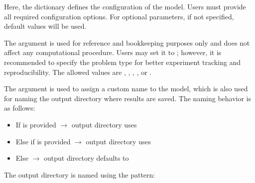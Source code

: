 \documentclass[letterpaper,10pt,english,openany,oneside]{sphinxmanual}
\begin{document}
\begin{sphinxVerbatim}[commandchars=\\\{\}]
    
\end{sphinxVerbatim}

\sphinxAtStartPar
Here, the  dictionary defines the configuration of the model.
Users must provide all required configuration options. For optional
parameters, if not specified, default values will be used.

\sphinxAtStartPar
The  argument is used for reference and bookkeeping purposes
only and does not affect any computational procedure. Users may set
it to ; however, it is recommended to specify the problem type
for better experiment tracking and reproducibility. The allowed values
are , , , , or .

\sphinxAtStartPar
The  argument is used to assign a custom name to the model,
which is also used for naming the output directory where results
are saved. The naming behavior is as follows:
\begin{itemize}
\item {} 
\sphinxAtStartPar
If  is provided \(\rightarrow\) output directory uses 

\item {} 
\sphinxAtStartPar
Else if  is provided \(\rightarrow\) output directory uses 

\item {} 
\sphinxAtStartPar
Else \(\rightarrow\) output directory defaults to 

\end{itemize}

\sphinxAtStartPar
The output directory is named using the pattern:

\sphinxAtStartPar
{}
\end{document}
